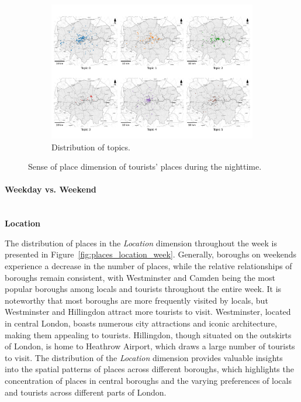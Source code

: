 \documentclass{article}
\newcommand{\subsubsubsection}[1]{\paragraph{#1}\mbox{}\\}
\theoremstyle{remark}
\begin{document}
\begin{figure}[!h]
    \begin{subfigure}{0.9\textwidth}
        \centering
        \includegraphics[width=\linewidth]{figures/topics_distribution_nighttime_tourists.png} 
        \caption{Distribution of topics.}
        \label{fig:topics_distribution_nighttime_tourists}
    \end{subfigure}

    \caption{Sense of place dimension of tourists' places during the nighttime.}
    \label{fig:places_topics_sense_tourists_nighttime}
\end{figure}

\clearpage

\subsubsubsection{Weekday vs. Weekend}

\textbf{Location}

The distribution of places in the \textit{Location} dimension throughout the week is presented in Figure~\ref{fig:places_location_week}. Generally, boroughs on weekends experience a decrease in the number of places, while the relative relationships of boroughs remain consistent, with Westminster and Camden being the most popular boroughs among locals and tourists throughout the entire week. It is noteworthy that most boroughs are more frequently visited by locals, but Westminster and Hillingdon attract more tourists to visit. Westminster, located in central London, boasts numerous city attractions and iconic architecture, making them appealing to tourists. Hillingdon, though situated on the outskirts of London, is home to Heathrow Airport, which draws a large number of tourists to visit. The distribution of the \textit{Location} dimension provides valuable insights into the spatial patterns of places across different boroughs, which highlights the concentration of places in central boroughs and the varying preferences of locals and tourists across different parts of London.
\end{document}
